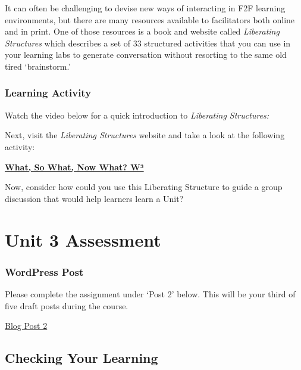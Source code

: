 \documentclass[
]{book}
\begin{document}
It can often be challenging to devise new ways of interacting in F2F learning environments, but there are many resources available to facilitators both online and in print. One of those resources is a book and website called \emph{Liberating Structures} which describes a set of 33 structured activities that you can use in your learning labs to generate conversation without resorting to the same old tired `brainstorm.'

\begin{reflect}
\hypertarget{learning-activity-8}{%
\subsubsection{Learning Activity}\label{learning-activity-8}}

Watch the video below for a quick introduction to \emph{Liberating Structures:}

Next, visit the \emph{Liberating Structures} website and take a look at the following activity:

\href{http://www.liberatingstructures.com/9-what-so-what-now-what-w/}{\textbf{What, So What, Now What? W³}}

Now, consider how could you use this Liberating Structure to guide a group discussion that would help learners learn a Unit?
\end{reflect}

\hypertarget{unit-3-assessment}{%
\section*{Unit 3 Assessment}\label{unit-3-assessment}}

\begin{wp}
\hypertarget{wordpress-post}{%
\subsubsection{WordPress Post}\label{wordpress-post}}

Please complete the assignment under `Post 2' below. This will be your third of five draft posts during the course.

\href{https://ma-lead.github.io/ldrs663/assessments.html\#post-2}{Blog Post 2}
\end{wp}

\hypertarget{checking-your-learning}{%
\subsection*{Checking Your Learning}\label{checking-your-learning}}
\end{document}
